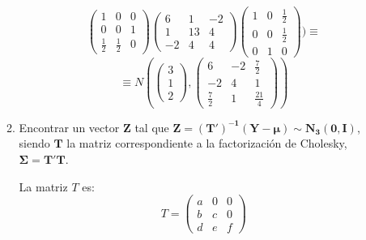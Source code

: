 \documentclass[11pt,a4paper]{article}
\begin{document}
\begin{enumerate}[label=\arabic*.]
\begin{enumerate}[label=\arabic*)]
$$\begin{pmatrix}
1 & 0 & 0 \\
0 & 0 & 1 \\
\frac{1}{2} & \frac{1}{2} & 0
\end{pmatrix} \begin{pmatrix}
6 & 1 & -2 \\
1 & 13 & 4 \\
-2 & 4 & 4
\end{pmatrix} \begin{pmatrix}
1 & 0 & \frac{1}{2} \\
0 & 0 & \frac{1}{2} \\
0 & 1 & 0
\end{pmatrix}) \equiv$$
$$\equiv N(\begin{pmatrix} 3 \\ 1 \\ 2 \end{pmatrix}, \begin{pmatrix}
6 & -2 & \frac{7}{2} \\
-2 & 4 & 1 \\
\frac{7}{2} & 1 & \frac{21}{4}
\end{pmatrix})$$


\bfseries
\vspace{1cm}
\item Encontrar un vector $\mathbf{Z}$ tal que $\mathbf{Z = (T')^{-1}(Y - \mu) \sim N_{3}(0, I)}$, siendo $\mathbf{T}$ la matriz correspondiente a la factorización de Cholesky, $\mathbf{\Sigma = T'T}$.
\vspace{0.5cm}
\normalfont

La matriz $T$ es:
$$T = \begin{pmatrix}
a & 0 & 0 \\
b & c & 0 \\
d & e & f
\end{pmatrix}$$


\end{enumerate}
\end{enumerate}
\end{document}
